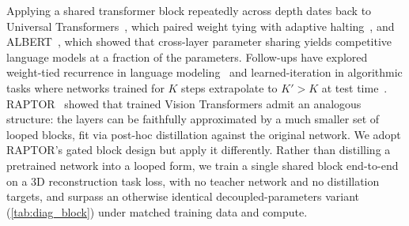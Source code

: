Applying a shared transformer block repeatedly across depth dates back to Universal Transformers~\citep{dehghani2019universal}, which paired weight tying with adaptive halting~\citep{graves2016adaptive}, and ALBERT~\citep{lan2020albert}, which showed that cross-layer parameter sharing yields competitive language models at a fraction of the parameters. Follow-ups have explored weight-tied recurrence in language modeling~\citep{hutchins2022blockrecurrent,yang2024looped,saunshi2025reasoning,geiping2025scaling} and learned-iteration in algorithmic tasks where networks trained for $K$ steps extrapolate to $K' > K$ at test time~\citep{schwarzschild2021algorithm,bansal2022endtoend}.
RAPTOR~\citep{jacobs2025raptor} showed that trained Vision Transformers admit an analogous structure: the layers can be faithfully approximated by a much smaller set of looped blocks, fit via post-hoc distillation against the original network. We adopt RAPTOR's gated block design but apply it differently. Rather than distilling a pretrained network into a looped form, we train a single shared block end-to-end on a 3D reconstruction task loss, with no teacher network and no distillation targets, and surpass an otherwise identical decoupled-parameters variant (\cref{tab:diag_block}) under matched training data and compute.



